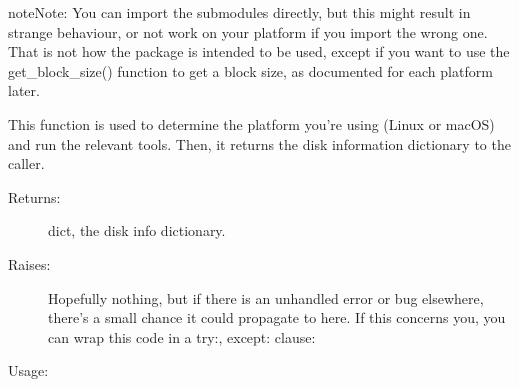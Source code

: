 \documentclass[letterpaper,10pt,english]{sphinxmanual}
\begin{document}
\begin{sphinxadmonition}{note}{Note:}
You can import the submodules directly, but this might result
in strange behaviour, or not work on your platform if you
import the wrong one.  That is not how the package is intended
to be used, except if you want to use the get\_block\_size()
function to get a block size, as documented for each platform
later.
\end{sphinxadmonition}

\begin{fulllineitems}
\label{\detokenize{getdevinfo:getdevinfo.getdevinfo.get_info}}
This function is used to determine the platform you’re using
(Linux or macOS) and run the relevant tools. Then, it returns
the disk information dictionary to the caller.
\begin{description}
\item[{Returns:}] \leavevmode
dict, the disk info dictionary.

\item[{Raises:}] \leavevmode
Hopefully nothing, but if there is an unhandled error or
bug elsewhere, there’s a small chance it could propagate
to here. If this concerns you, you can wrap this code in
a try:, except: clause:

\begin{sphinxVerbatim}[commandchars=\\\{\}]
    
    
\end{sphinxVerbatim}

\end{description}

Usage:

\begin{sphinxVerbatim}[commandchars=\\\{\}]
  
\end{sphinxVerbatim}

\end{fulllineitems}
\end{document}
